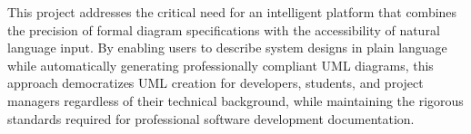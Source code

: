 \documentclass[a4paper,12pt]{report}
\begin{document}
This project addresses the critical need for an intelligent platform that combines the precision of formal diagram specifications with the accessibility of natural language input. By enabling users to describe system designs in plain language while automatically generating professionally compliant UML diagrams, this approach democratizes UML creation for developers, students, and project managers regardless of their technical background, while maintaining the rigorous standards required for professional software development documentation.















% 




\end{document}
